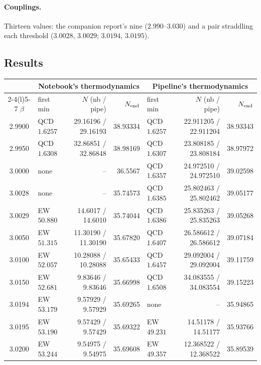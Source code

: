\documentclass[11pt,a4paper]{article}
\begin{document}
\paragraph{Couplings.} Thirteen values: the companion report's nine ($2.990$--$3.030$) and a
pair straddling each threshold ($3.0028$, $3.0029$; $3.0194$, $3.0195$).

\subsection{Results}

\begin{table}[ht]
\centering\footnotesize
\begin{tabular}{@{}c@{\hspace{1em}}lrr@{\hspace{1.5em}}lrr@{}}
\toprule
 & \multicolumn{3}{c}{Notebook's thermodynamics} & \multicolumn{3}{c}{Pipeline's thermodynamics} \\
\cmidrule(lr){2-4}\cmidrule(l){5-7}
$\beta$ & first min & $N$ (nb / pipe) & $N_{\rm end}$ & first min & $N$ (nb / pipe) & $N_{\rm end}$ \\
\midrule
2.9900 & QCD $1.6257$ & 29.16196 / 29.16193 & 38.93334 & QCD $1.6257$ & 22.911205 / 22.911204 & 38.93343 \\
2.9950 & QCD $1.6308$ & 32.86851 / 32.86848 & 38.98169 & QCD $1.6307$ & 23.808185 / 23.808184 & 38.97972 \\
3.0000 & none & -- & 36.5567 & QCD $1.6357$ & 24.972510 / 24.972510 & 39.02598 \\
3.0028 & none & -- & 35.74573 & QCD $1.6385$ & 25.802463 / 25.802462 & 39.05177 \\
3.0029 & EW $50.880$ & 14.6017 / 14.6010 & 35.74044 & QCD $1.6386$ & 25.835263 / 25.835263 & 39.05268 \\
3.0050 & EW $51.315$ & 11.30190 / 11.30190 & 35.67820 & QCD $1.6407$ & 26.586612 / 26.586612 & 39.07184 \\
3.0100 & EW $52.057$ & 10.28088 / 10.28088 & 35.65433 & QCD $1.6457$ & 29.092004 / 29.092004 & 39.11759 \\
3.0150 & EW $52.681$ & 9.83646 / 9.83646 & 35.66998 & QCD $1.6508$ & 34.083555 / 34.083554 & 39.15223 \\
3.0194 & EW $53.179$ & 9.57929 / 9.57929 & 35.69265 & none & -- & 35.94865 \\
3.0195 & EW $53.190$ & 9.57429 / 9.57429 & 35.69322 & EW $49.231$ & 14.51178 / 14.51177 & 35.93766 \\
3.0200 & EW $53.244$ & 9.54975 / 9.54975 & 35.69608 & EW $49.357$ & 12.368522 / 12.368522 & 35.89539 \\

\end{tabular}
\end{table}
\end{document}
